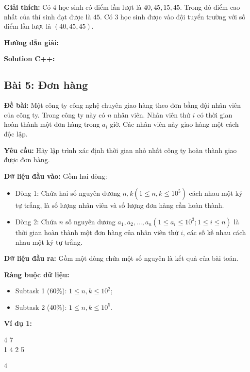 \documentclass[12pt]{scrartcl}  %
\begin{document}
\textbf{Giải thích:}
Có $4$ học sinh có điểm lần lượt là $40, 45, 15, 45$. Trong đó điểm cao nhất của thí sinh đạt được là $45$. Có $3$ học sinh được vào đội tuyển trường với số điểm lần lượt là $(40, 45, 45)$. 

\textbf{Hướng dẫn giải:}

\textbf{Solution C++:}

\subsection{Bài 5: Đơn hàng}

\textbf{Đề bài:}
Một công ty công nghệ chuyên giao hàng theo đơn bằng đội nhân viên của công ty. Trong công ty này có $n$ nhân viên. Nhân viên thứ $i$ có thời gian hoàn thành một đơn hàng trong $a_i$ giờ. Các nhân viên này giao hàng một cách độc lập. 

\textbf{Yêu cầu:}
Hãy lập trình xác định thời gian nhỏ nhất công ty hoàn thành giao được đơn hàng. 

\textbf{Dữ liệu đầu vào:}
Gồm hai dòng:
\begin{itemize}
    \item Dòng 1: Chứa hai số nguyên dương $n, k (1 \leq n, k \leq 10^5)$ cách nhau một ký tự trắng, là số lượng nhân viên và số lượng đơn hàng cần hoàn thành. 
    \item Dòng 2: Chứa $n$ số nguyên dương $a_1, a_2, ... , a_n (1 \leq a_i \leq 10^3; 1 \leq i \leq n)$ là thời gian hoàn thành một đơn hàng của nhân viên thứ $i$, các số kề nhau cách nhau một ký tự trắng.
\end{itemize}

\textbf{Dữ liệu đầu ra:}
Gồm một dòng chứa một số nguyên là kết quả của bài toán.

\textbf{Ràng buộc dữ liệu:}
\begin{itemize}
    \item Subtask 1 (60\%): $1 \leq n, k \leq 10^2$;
    \item Subtask 2 (40\%): $1 \leq n, k \leq 10^5$.
\end{itemize}

\textbf{Ví dụ 1:}
\begin{tcolorbox}[colback=gray!5!white, colframe=blue!50!black, title=Input]
4 7\\
1 4 2 5
\end{tcolorbox}

\begin{tcolorbox}[colback=gray!5!white, colframe=green!50!black, title=Output]
4
\end{tcolorbox}
\end{document}
